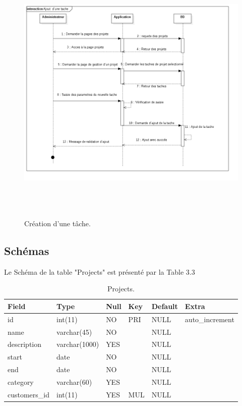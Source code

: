 \begin{figure}[H]
\center
\includegraphics[width=14cm,height=13cm]{./figures/seq/C.png}
\caption{Cr\'{e}ation d'une t\^{a}che.}
\end{figure}



\newpage

\subsection{ Sch\'{e}mas }
Le Sch\'{e}ma de la table "Projects" est pr\'{e}sent\'{e} par la Table 3.3

\begin{table}

\begin{tabular}{|l|l|l|l|l|l|}
\hline
Field         & Type          & Null & Key & Default & Extra            \\
\hline
id            & int(11)       & NO   & PRI & NULL    & auto\_increment  \\
\hline
name          & varchar(45)   & NO   &     & NULL    &                  \\
\hline
description   & varchar(1000) & YES  &     & NULL    &                  \\
\hline
start         & date          & NO   &     & NULL    &                  \\
\hline
end           & date          & NO   &     & NULL    &                  \\
\hline
category      & varchar(60)   & YES  &     & NULL    &                  \\
\hline
customers\_id & int(11)       & YES  & MUL & NULL    &                  \\
\hline
\end{tabular}
\centering
 \caption {Projects.}
\end{table}


